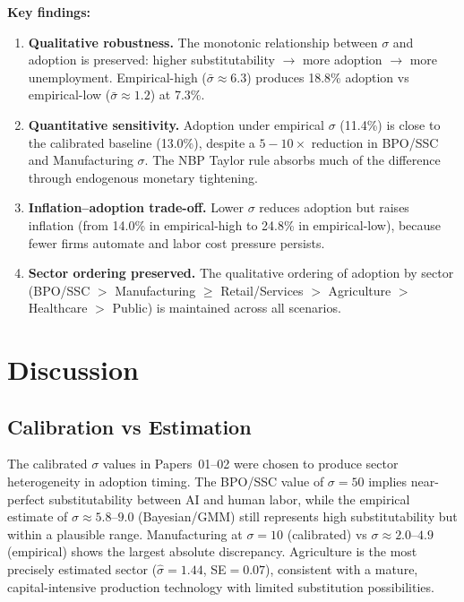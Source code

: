 \documentclass[11pt,a4paper]{article}
\begin{document}
\textbf{Key findings:}
\begin{enumerate}
    \item \textbf{Qualitative robustness.} The monotonic relationship between $\sigma$ and adoption is preserved: higher substitutability $\to$ more adoption $\to$ more unemployment.
    Empirical-high ($\bar{\sigma} \approx 6.3$) produces 18.8\% adoption vs empirical-low ($\bar{\sigma} \approx 1.2$) at 7.3\%.
    \item \textbf{Quantitative sensitivity.} Adoption under empirical $\sigma$ (11.4\%) is close to the calibrated baseline (13.0\%), despite a $5{-}10\times$ reduction in BPO/SSC and Manufacturing $\sigma$.
    The NBP Taylor rule absorbs much of the difference through endogenous monetary tightening.
    \item \textbf{Inflation--adoption trade-off.} Lower $\sigma$ reduces adoption but raises inflation (from 14.0\% in empirical-high to 24.8\% in empirical-low), because fewer firms automate and labor cost pressure persists.
    \item \textbf{Sector ordering preserved.} The qualitative ordering of adoption by sector (BPO/SSC $>$ Manufacturing $\geq$ Retail/Services $>$ Agriculture $>$ Healthcare $>$ Public) is maintained across all scenarios.
\end{enumerate}


\section{Discussion}
\label{sec:discussion}

\subsection{Calibration vs Estimation}

The calibrated $\sigma$ values in Papers~01--02 were chosen to produce sector heterogeneity in adoption timing.
The BPO/SSC value of $\sigma=50$ implies near-perfect substitutability between AI and human labor, while the empirical estimate of $\sigma \approx 5.8$--$9.0$ (Bayesian/GMM) still represents high substitutability but within a plausible range.
Manufacturing at $\sigma=10$ (calibrated) vs $\sigma \approx 2.0$--$4.9$ (empirical) shows the largest absolute discrepancy.
Agriculture is the most precisely estimated sector ($\hat{\sigma}=1.44$, SE$=0.07$), consistent with a mature, capital-intensive production technology with limited substitution possibilities.
\end{document}
